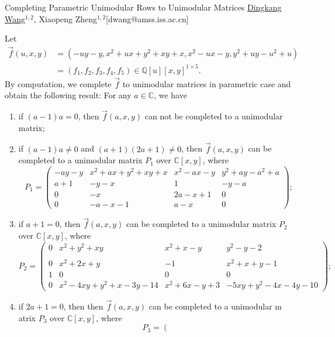 \begin{abstract_online}{Completing Parametric Unimodular Rows to Unimodular Matrices}{%
        \underline{Dingkang Wang}$^{1,2}$, Xiaopeng Zheng$^{1,2}$}{[dwang@amss.iss.ac.cn]
        }
\begin{example}
	Let 
	\begin{align*}
		\vec{f}(u,x,y) &= \left(-uy-y,x^{2}+u x+y^{2}+x y+x,x^{2}-u x-y,y^2+u y-u^{2}+u \right)\\
		& = (f_1,f_2,f_3,f_4,f_5)\in \mathbb{Q}[u][x,y]^{1\times 5}.
	\end{align*} 
By computation, we complete $\vec{f}$ to unimodular matrices in parametric case and obtain the following result: For any $a \in \mathbb{C}$, we have
	\vspace{-0.4cm}
	\begin{enumerate}
		\item[(1)] if $\left(a-1\right)a = 0$, then $\vec{f}(a,x,y)$ can not be completed to a unimodular matrix;
		\item[(2)] if $(a-1)a \neq 0$ and $(a+1)(2a+1) \neq 0$, then $\vec{f}(a,x,y)$ can be completed to a unimodular matrix $P_1$
		over $\mathbb{C}[x,y]$, where
		$$P_1 = \left(\begin{smallmatrix}
			-ay-y &x^{2}+ax+y^{2}+x y+x & x^{2}-a x-y & y^2+a y-a^{2}+a
			\\
			a+1 & -y-x & 1 & -y-a 
			\\
			0 & -x & 2 a-x+1 & 0 
			\\
			0 & -a-x-1 & a-x & 0 
		\end{smallmatrix}\right);$$
	    \item[(3)] if $a+1 = 0$, then $\vec{f}(a,x,y)$ can be completed to a unimodular matrix $P_2$ 
	    over $\mathbb{C}[x,y]$, where
	    	$$P_2 = \left(\begin{smallmatrix}
	    	0 & x^{2}+y^{2}+x y & x^{2}+ x-y & y^2- y - 2\\
	    	\\
	    	0 & x^{2}+2 x+y & -1 & x^{2}+x+y-1 
	    	\\
	    	1 & 0 & 0 & 0 
	    	\\
	    	0 & x^{2}-4 x y+y^{2}+x-3 y-14 & x^{2}+6 x-y+3 & -5 x y+y^{2}-4 x-4 y-10 
	    \end{smallmatrix}\right);$$
        \item[(4)] if $2a+1=0$, then then $\vec{f}(a,x,y)$ can be completed to a unimodular m
        atrix $P_3$ over $\mathbb{C}[x,y]$, where
        	$$P_3 = \left(\begin{smallmatrix}

\end{smallmatrix}$$
\end{enumerate}
\end{example}
\end{abstract_online}
